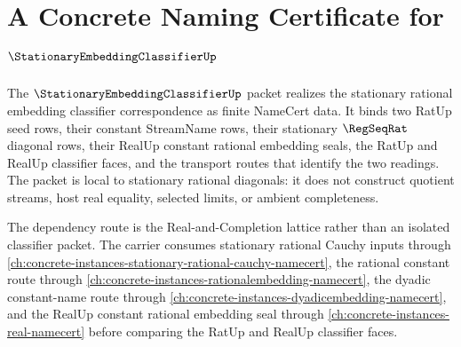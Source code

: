\chapter{A Concrete Naming Certificate for $\StationaryEmbeddingClassifierUp$}
\label{ch:concrete-instances-stationaryembeddingclassifier-namecert}

The $\StationaryEmbeddingClassifierUp$ packet realizes the stationary rational embedding classifier correspondence as finite NameCert data. It binds two RatUp seed rows, their constant StreamName rows, their stationary $\RegSeqRat$ diagonal rows, their RealUp constant rational embedding seals, the RatUp and RealUp classifier faces, and the transport routes that identify the two readings. The packet is local to stationary rational diagonals: it does not construct quotient streams, host real equality, selected limits, or ambient completeness.

The dependency route is the Real-and-Completion lattice rather than an isolated classifier packet. The carrier consumes stationary rational Cauchy inputs through \autoref{ch:concrete-instances-stationary-rational-cauchy-namecert}, the rational constant route through \autoref{ch:concrete-instances-rationalembedding-namecert}, the dyadic constant-name route through \autoref{ch:concrete-instances-dyadicembedding-namecert}, and the RealUp constant rational embedding seal through \autoref{ch:concrete-instances-real-namecert} before comparing the RatUp and RealUp classifier faces.

